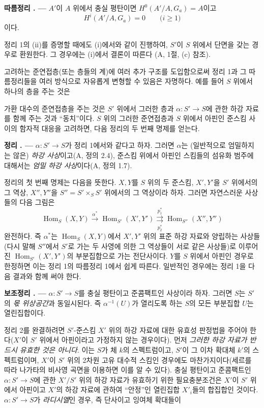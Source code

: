 \documentclass[11pt,twoside,openany]{book}
\numberwithin{equation}{section}
\newcommand{\sourceunit}{front}
\newcommand{\src}[1]{%
  \phantomsection\hypertarget{src:\sourceunit:#1}{}%
  \marginpar{\raggedleft\footnotesize\sffamily #1}%
}
\theoremstyle{plain}
\theoremstyle{definition}
\theoremstyle{remark}
\newcommand{\result}[2]{%
  \par\medskip\noindent\textbf{#1%
  \if\relax\detokenize{#2}\relax\else\space#2\fi. ---}\enspace
}
\begin{document}
\result{따름정리}{} $A'$이 $A$ 위에서 충실 평탄이면
$H^0(A'/A,G_a)=A$이고
\[
  H^i(A'/A,G_a)=0\qquad\text{($i\geq1$)}
\]
이다.

정리 1의 (ii)를 증명할 때에도 (i)에서와 같이 진행하여, $S'$이 $S$
위에서 단면을 갖는 경우로 환원한다. 그 경우에는 (i)에서 결론이 따른다
(A, 1절, (c) 참조).

고려하는 준연접층(또는 층들의 계)에 여러 추가 구조를 도입함으로써
정리 1과 그 따름정리들을 여러 방식으로 자유롭게 변형할 수 있음은
자명하다. 예를 들어 $S$ 위에서 하나의 층을 주는 것은
\src{317}
가환 대수의 준연접층을 주는 것은 $S'$ 위에서 그러한 층과
$\alpha:S'\longrightarrow S$에 관한 하강 자료를 함께 주는 것과
“동치”이다. $S$ 위의 그러한 준연접층과 $S$ 위에서 아핀인
준스킴 사이의 함자적 대응을 고려하면, 다음 정리의 두 번째 명제를
얻는다.

\result{정리}{2} $\alpha:S'\longrightarrow S$가 정리 1에서와 같다고
하자. 그러면 $\alpha$는 (일반적으로 엄밀하지는 않은)
\emph{하강 사상}이고(A, 정의 2.4), 준스킴 위에서 아핀인 스킴들의
섬유화 범주에 대해서는 \emph{엄밀 하강 사상}이다(A, 정의 1.7).

정리의 첫 번째 명제는 다음을 뜻한다. $X,Y$를 $S$ 위의 두 준스킴,
$X',Y'$을 $S'$ 위에서의 그 역상, $X'',Y''$을
$S''=S'\times_SS'$ 위에서의 그 역상이라 하자. 그러면 자연스러운
사상들의 다음 그림은
\[
  \operatorname{Hom}_S(X,Y)\xrightarrow{\alpha^*}
  \operatorname{Hom}_{S'}(X',Y')
  \underset{p_2^*}{\overset{p_1^*}{\rightrightarrows}}
  \operatorname{Hom}_{S''}(X'',Y'')
\]
완전하다. 즉 $\alpha^*$는 $\operatorname{Hom}_S(X,Y)$에서
$X',Y'$ 위의 표준 하강 자료와 양립하는 사상들(다시 말해 $S''$에서
$S'$로 가는 두 사영에 의한 그 역상들이 서로 같은 사상들)로 이루어진
$\operatorname{Hom}_{S'}(X',Y')$의 부분집합으로 가는 전단사이다.
$Y$를 $S$ 위에서 아핀인 경우로 한정하면 이는 정리 1의 따름정리 1에서
쉽게 따른다. 일반적인 경우에는 정리 1을 다음 결과와 함께 써야 한다.

\result{보조정리}{1.2} $\alpha:S'\longrightarrow S$를 충실 평탄이고
준콤팩트인 사상이라 하자. 그러면 $S$는 $S'$의 \emph{몫 위상공간}과
동일시된다. 즉 $\alpha^{-1}(U)$가 열리도록 하는 $S$의 모든 부분집합
$U$는 열린집합이다.

정리 2를 완결하려면 $S'$-준스킴 $X'$ 위의 하강 자료에 대한 유효성
판정법을 주어야 한다($X'$이 $S'$ 위에서 아핀이라고 가정하지 않는
경우이다). 먼저 \emph{그러한 하강 자료가 반드시 유효한 것은
아니다}. 이는 $S$가 체 $k$의 스펙트럼이고, $S'$이 그 이차 확대체
$k'$의 스펙트럼이며, $X'$이 $S'$ 위의 2차원 고유 대수적 스킴인
경우에도 마찬가지이다(세르를 따라 나가타의 비사영 곡면을 이용하면
이를 알 수 있다). 충실 평탄이고 준콤팩트인
$\alpha:S'\longrightarrow S$에 관한 $X'/S'$ 위의 하강 자료가
유효하기 위한 필요충분조건은 $X'$이 $S'$ 위에서 아핀이고 $X'$의
하강 자료에 관하여 “안정”인 열린집합 $X'_i$들의 합집합인
것이다. $\alpha:S'\longrightarrow S$가 \emph{라디시엘}인 경우,
즉 단사이고 잉여체 확대들이
\end{document}
